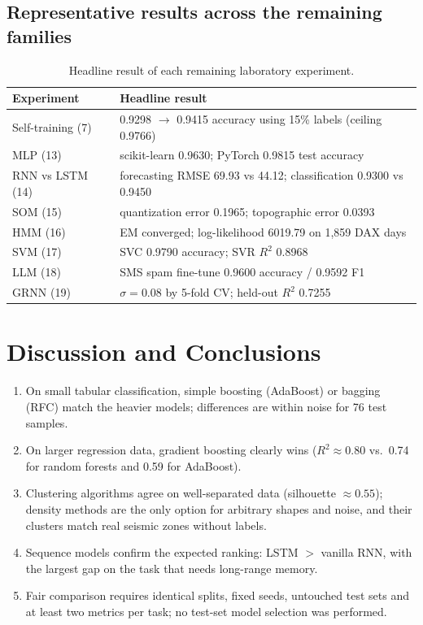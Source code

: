 \subsection{Representative results across the remaining families}
\begin{table}[htbp]
  \centering
  \caption{Headline result of each remaining laboratory experiment.}
  \begin{tabular}{|p{}|p{}|}
    \hline
\rowcolor{mlblue!8}    \textbf{Experiment} & \textbf{Headline result} \\
    \hline
    Self-training (7) & 0.9298 $\rightarrow$ 0.9415 accuracy using 15\% labels (ceiling 0.9766) \\
\hline
    MLP (13) & scikit-learn 0.9630; PyTorch 0.9815 test accuracy \\
\hline
    RNN vs LSTM (14) & forecasting RMSE 69.93 vs 44.12; classification 0.9300 vs 0.9450 \\
\hline
    SOM (15) & quantization error 0.1965; topographic error 0.0393 \\
\hline
    HMM (16) & EM converged; log-likelihood 6019.79 on 1,859 DAX days \\
\hline
    SVM (17) & SVC 0.9790 accuracy; SVR $R^2$ 0.8968 \\
\hline
    LLM (18) & SMS spam fine-tune 0.9600 accuracy / 0.9592 F1 \\
\hline
    GRNN (19) & $\sigma = 0.08$ by 5-fold CV; held-out $R^2$ 0.7255 \\
    \hline
  \end{tabular}
\end{table}

\section{Discussion and Conclusions}
\begin{enumerate}
  \item On small tabular classification, simple boosting (AdaBoost) or bagging (RFC) match the
        heavier models; differences are within noise for 76 test samples.
  \item On larger regression data, gradient boosting clearly wins ($R^2 \approx 0.80$ vs.\
        0.74 for random forests and 0.59 for AdaBoost).
  \item Clustering algorithms agree on well-separated data (silhouette $\approx 0.55$);
        density methods are the only option for arbitrary shapes and noise, and their clusters
        match real seismic zones without labels.
  \item Sequence models confirm the expected ranking: LSTM $>$ vanilla RNN, with the largest
        gap on the task that needs long-range memory.
  \item Fair comparison requires identical splits, fixed seeds, untouched test sets and at
        least two metrics per task; no test-set model selection was performed.
\end{enumerate}

